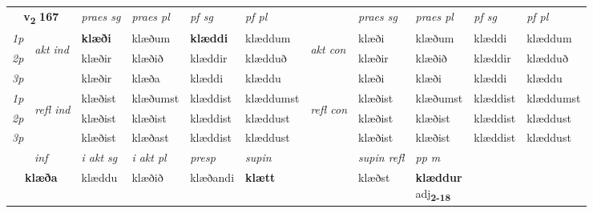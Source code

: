 \noindent
\begin{tabular}{lllllllllll} \toprule
\multicolumn{2}{c}{\textbf{v{\textsubscript{2}}} \Large{\textbf{167}}}  &  \textit{praes sg}  & \textit{praes pl}  &\textit{ pf sg} & \textit{pf pl} &  &  \textit{praes sg}  & \textit{praes pl}  & \textit{pf sg} & \textit{pf pl } \\*
	\cmidrule{3-6} \cmidrule{8-11}
 {\textit{1p}} & \multirow{3}{*}{\begin{turn}{90}\textit{akt ind}\end{turn}} & \textbf{klæði} & klæðum & \textbf{klæddi} & klæddum & \multirow{3}{*}{\begin{turn}{90}\textit{akt con}\end{turn}} &klæði & klæðum & klæddi & klæddum\\*
 {\textit{2p}} &  &  klæðir  & klæðið & klæddir & klædduð & & klæðir & klæðið & klæddir & klædduð \\*
{\textit{3p}} &  & klæðir & klæða & klæddi & klæddu & & klæði & klæði& klæddi & klæddu \\*
\cmidrule{3-6} \cmidrule{8-11}
 {\textit{1p}} & \multirow{3}{*}{\begin{turn}{90}\textit{refl ind}\end{turn}}  & klæðist & klæðumst & klæddist & klæddumst & \multirow{3}{*}{\begin{turn}{90}\textit{refl con}\end{turn}}  &klæðist & klæðumst & klæddist & klæddumst \\*
 {\textit{2p}} &  & klæðist & klæðist & klæddist & klæddust & &klæðist & klæðist & klæddist & klæddust \\*
 {\textit{3p}}  & & klæðist & klæðast & klæddist & klæddust & & klæðist & klæðist& klæddist & klæddust \\*
\cmidrule{3-6} \cmidrule{8-11}

   \multicolumn{2}{c}{\textit{inf}}  & \textit{i akt sg} & \textit{i akt pl}   & \textit{presp} & \textit{supin} && \textit{supin refl} & \textit{pp m} \\*
  \multicolumn{2}{c}{\textbf{klæða}} & klæddu  & klæðið   & klæðandi &  \textbf{klætt} && klæðst & \specialcell{\textbf{klæddur} \\ adj\textbf{\textsubscript{2-18}}} \\*
\end{tabular}

